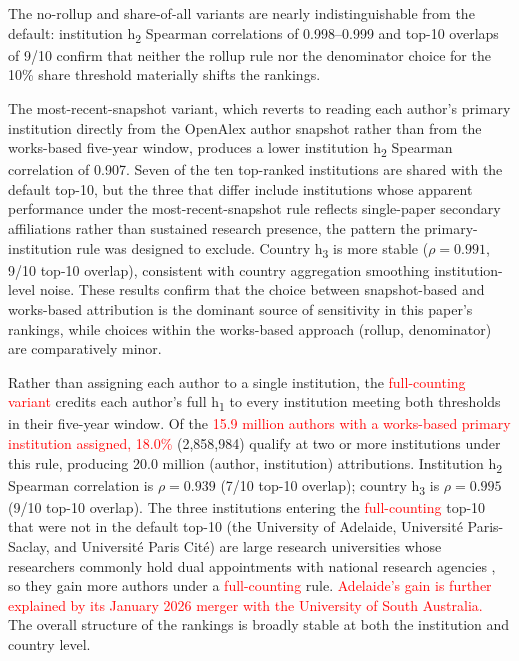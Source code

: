 The no-rollup and share-of-all variants are nearly indistinguishable from the default: institution h\textsubscript{2} Spearman correlations of 0.998--0.999 and top-10 overlaps of 9/10 confirm that neither the rollup rule nor the denominator choice for the 10\% share threshold materially shifts the rankings.

The most-recent-snapshot variant, which reverts to reading each author's primary institution directly from the OpenAlex author snapshot rather than from the works-based five-year window, produces a lower institution h\textsubscript{2} Spearman correlation of 0.907. Seven of the ten top-ranked institutions are shared with the default top-10, but the three that differ include institutions whose apparent performance under the most-recent-snapshot rule reflects single-paper secondary affiliations rather than sustained research presence, the pattern the primary-institution rule was designed to exclude. Country h\textsubscript{3} is more stable ($\rho = 0.991$, 9/10 top-10 overlap), consistent with country aggregation smoothing institution-level noise. These results confirm that the choice between snapshot-based and works-based attribution is the dominant source of sensitivity in this paper's rankings, while choices within the works-based approach (rollup, denominator) are comparatively minor.

Rather than assigning each author to a single institution, the \textcolor{red}{full-counting variant} credits each author's full h\textsubscript{1} to every institution meeting both thresholds in their five-year window. Of the \textcolor{red}{15.9 million authors with a works-based primary institution assigned, 18.0\%} (2,858,984) qualify at two or more institutions under this rule, producing 20.0 million (author, institution) attributions. Institution h\textsubscript{2} Spearman correlation is $\rho = 0.939$ (7/10 top-10 overlap); country h\textsubscript{3} is $\rho = 0.995$ (9/10 top-10 overlap). The three institutions entering the \textcolor{red}{full-counting} top-10 that were not in the default top-10 (the University of Adelaide, Universit\'{e} Paris-Saclay, and Universit\'{e} Paris Cit\'{e}) are large research universities whose researchers commonly hold dual appointments with national research agencies \citep{cnrsHome,insermHome}, so they gain more authors under a \textcolor{red}{full-counting} rule. \textcolor{red}{Adelaide's gain is further explained by its January 2026 merger with the University of South Australia.~\citep{adelaideMerger}} The overall structure of the rankings is broadly stable at both the institution and country level.

